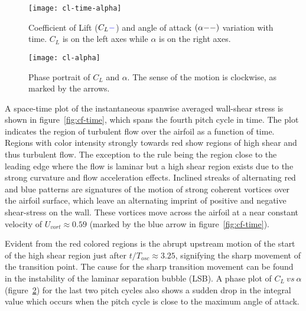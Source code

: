 \documentclass[twocolumn,10pt]{tsfp}
\begin{document}
\begin{figure}[t]
	\centering
	\texttt{[image: cl-time-alpha]}
	\caption{Coefficient of Lift ($C_{L} \textcolor{blue}{-}$) and angle of attack $(\alpha \textcolor{black}{--})$ variation with time. $C_{L}$ is on the left axes while $\alpha$ is on the right axes.}
	\label{fig:cl-time-alpha}
\end{figure}

\begin{figure}[h]
	\centering
	\texttt{[image: cl-alpha]}
	\caption{Phase portrait of $C_{L}$ and $\alpha$. The sense of the motion is clockwise, as marked by the arrows.}
	\label{fig:cl-alpha}
\end{figure}

A space-time plot of the instantaneous spanwise averaged wall-shear stress is shown in figure~\ref{fig:cf-time}, which spans the fourth pitch cycle in time. The plot indicates the region of turbulent flow over the airfoil as a function of time. Regions with color intensity strongly towards red show regions of high shear and thus turbulent flow. The exception to the rule being the region close to the leading edge where the flow is laminar but a high shear region exists due to the strong curvature and flow acceleration effects. Inclined streaks of alternating red and blue patterns are signatures of the motion of strong coherent vortices over the airfoil surface, which leave an alternating imprint of positive and negative shear-stress on the wall. These vortices move across the airfoil at a near constant velocity of $U_{vort}\approx0.59$ (marked by the blue arrow in figure~\ref{fig:cf-time}).

Evident from the red colored regions is the abrupt upstream motion of the start of the high shear region just after $t/T_{osc}\approx3.25$, signifying the sharp movement of the transition point. The cause for the sharp transition movement can be found in the instability of the laminar separation bubble (LSB). A phase plot of $C_{L}\ vs\ \alpha$ (figure~\ref{fig:cl-alpha}) for the last two pitch cycles also shows a sudden drop in the integral value which occurs when the pitch cycle is close to the maximum angle of attack.
\end{document}
